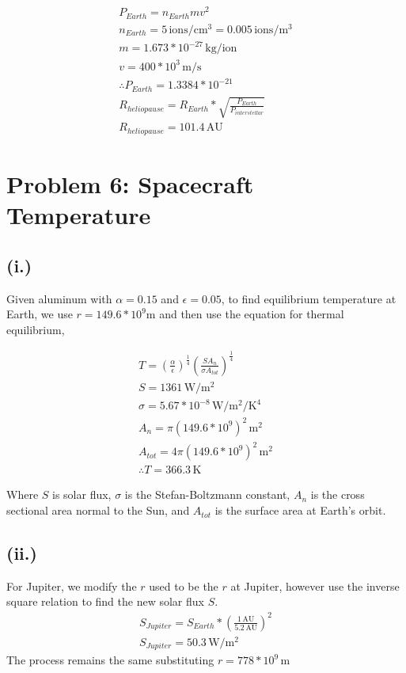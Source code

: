 \documentclass[11pt]{article}
\begin{document}
\[
\begin{gathered}
P_{Earth} = n_{Earth}mv^2 \\
n_{Earth} = 5 \, \mathrm{ions/cm^3} = 0.005 \, \mathrm{ions/m^3}\\
m = 1.673*10^{-27} \, \mathrm{kg/ion}\\
v = 400*10^3 \, \mathrm{m/s} \\
\therefore P_{Earth} = 1.3384*10^{-21} \\
R_{heliopause} = R_{Earth}*\sqrt{\frac{P_{Earth}}{P_{interstellar}}} \\
\boxed{R_{heliopause} = 101.4 \, \mathrm{AU}}
\end{gathered}
\]


\section*{Problem 6: Spacecraft Temperature}

\subsection*{(i.)}
Given aluminum with $\alpha = 0.15$ and $\epsilon = 0.05$,
to find equilibrium temperature at Earth, we use $r = 149.6*10^9 \mathrm{m}$
and then use the equation for thermal equilibrium,

\[
\begin{gathered}
T = (\frac{\alpha}{\epsilon})^{\frac{1}{4}} (\frac{SA_n}{\sigma A_{tot}})^{\frac{1}{4}} \\
S = 1361 \, \mathrm{W/m^2} \\
\sigma = 5.67*10^{-8} \, \mathrm{W/m^2/K^4}\\
A_n = \pi (149.6*10^9)^2 \, \mathrm{m^2} \\
A_{tot} = 4\pi(149.6*10^9)^2 \, \mathrm{m^2} \\
\boxed{\therefore T = 366.3 \, \mathrm{K}}
\end{gathered}
\]

Where $S$ is solar flux, $\sigma$ is the Stefan-Boltzmann constant, $A_n$ is the 
cross sectional area normal to the Sun, and $A_{tot}$ is the surface area 
at Earth's orbit.

\subsection*{(ii.)}
For Jupiter, we modify the $r$ used to be the $r$ at Jupiter, however use the inverse square
relation to find the new solar flux $S$. 
\[
\begin{gathered}
S_{Jupiter} = S_{Earth}*(\frac{1 \, \mathrm{AU}}{5.2 \, \mathrm{AU}})^2 \\
S_{Jupiter} = 50.3 \, \mathrm{W/m^2}
\end{gathered}
\]
The process remains the same substituting $r = 778*10^9 \, \mathrm{m}$
\end{document}

